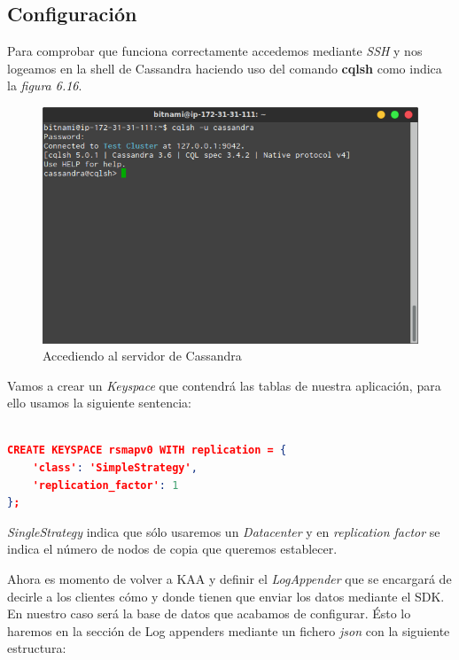 \subsection{Configuración}

Para comprobar que funciona correctamente accedemos mediante \textit{SSH} y nos logeamos en la shell de Cassandra haciendo uso del comando \textbf{cqlsh} como indica la \textit{figura 6.16}.

\begin{figure}[!ht]
  \begin{center}
    \includegraphics[scale=0.65]{../images/cassandra/3.png}
		\caption{Accediendo al servidor de Cassandra}
    \label{fig:kaa}
	\end{center}
\end{figure}

\newpage

Vamos a crear un \textit{Keyspace} que contendrá las tablas de nuestra aplicación, para ello usamos la siguiente sentencia:

\begin{lstlisting}[language=json,caption={Keyspace en Cassandra},label={lst:json_personal}]

CREATE KEYSPACE rsmapv0 WITH replication = {
	'class': 'SimpleStrategy',
	'replication_factor': 1
};

\end{lstlisting}

\textit{SingleStrategy} indica que sólo usaremos un \textit{Datacenter} y en \textit{replication factor} se indica el número de nodos de copia que queremos establecer.

\newpage

Ahora es momento de volver a KAA y definir el \textit{LogAppender} que se encargará de decirle a los clientes cómo y donde tienen que enviar los datos mediante el SDK. En nuestro caso será la base de datos que acabamos de configurar. Ésto lo haremos en la sección de Log appenders mediante un fichero \textit{json} con la siguiente estructura:


